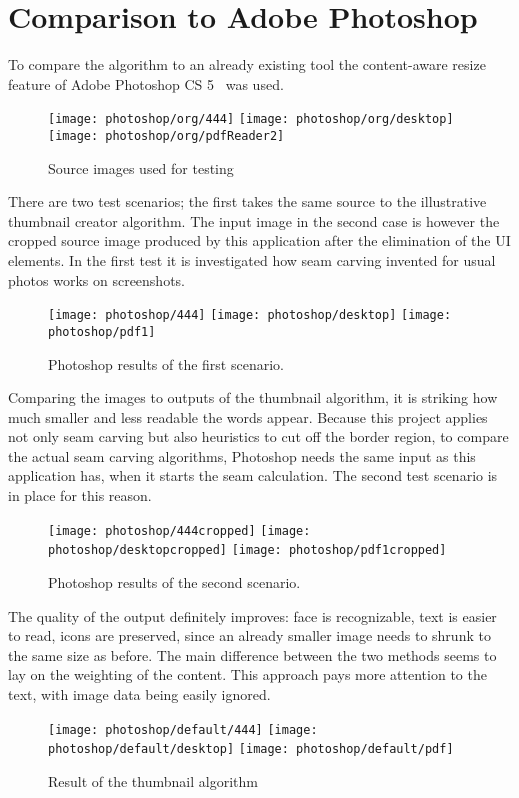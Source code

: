 \documentclass[draft,final]{vutinfth} %
\begin{document}
	\section{Comparison to Adobe Photoshop} 
	To compare the algorithm to an already existing tool the content-aware resize feature of Adobe Photoshop CS 5~\cite{photoshop} was used.
	\begin{figure}[H]
		\texttt{[image: photoshop/org/444]}\hfill
		\texttt{[image: photoshop/org/desktop]}\hfill
		\texttt{[image: photoshop/org/pdfReader2]}
		\caption{Source images used for testing}
	\end{figure}
	There are two test scenarios; the first takes the same source to the illustrative thumbnail creator algorithm.
	The input image in the second case is however the cropped source image produced by this application after the elimination of the UI elements.
	In the first test it is investigated how seam carving invented for usual photos works on screenshots.
	\begin{figure}[H]
		\texttt{[image: photoshop/444]}\hfill
		\texttt{[image: photoshop/desktop]}\hfill
		\texttt{[image: photoshop/pdf1]}
		\caption{Photoshop results of the first scenario.}
	\end{figure}
	Comparing  the images to outputs of the thumbnail algorithm, it is striking how much smaller and less readable the words appear.
	Because this project applies not only seam carving but also heuristics to cut off the border region, to compare the actual seam carving algorithms, Photoshop  needs the same input as this application has, when it starts the seam calculation.
	The second test scenario is in place for this reason.
	\begin{figure}[H]
		\texttt{[image: photoshop/444cropped]}\hfill
		\texttt{[image: photoshop/desktopcropped]}\hfill
		\texttt{[image: photoshop/pdf1cropped]}
		\caption{Photoshop results of the second scenario.}
	\end{figure}
	The quality of the  output definitely improves: face is recognizable, text is easier to read, icons are preserved, since an already smaller image needs to shrunk to the same size as before.
	The main difference between the two methods seems to lay on the weighting of the content.
	This approach pays more attention to the text, with image data being easily ignored.
	\begin{figure}[H]
		\texttt{[image: photoshop/default/444]}\hfill
		\texttt{[image: photoshop/default/desktop]}\hfill
		\texttt{[image: photoshop/default/pdf]}
		\caption{Result of the thumbnail algorithm}
	\end{figure}
\end{document}
